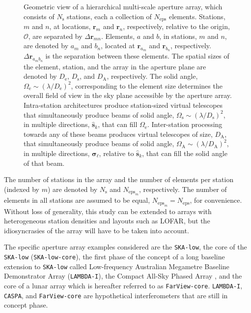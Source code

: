 \documentclass[
  journal=pasa,
  manuscript=article-type,
  year=2020,
  volume=37,
]{cup-journal}
\begin{document}
\begin{figure}
\caption{Geometric view of a hierarchical multi-scale aperture array, which consists of $N_\textrm{s}$ stations, each a collection of $N_\textrm{eps}$ elements. Stations, $m$ and $n$, at locations, $\boldsymbol{r}_m$ and $\boldsymbol{r}_n$, respectively, relative to the origin, $\mathcal{O}$, are separated by $\Delta\boldsymbol{r}_{mn}$. Elements, $a$ and $b$, in stations, $m$ and $n$, are denoted by $a_m$ and $b_n$, located at $\boldsymbol{r}_{a_m}$ and $\boldsymbol{r}_{b_n}$, respectively. $\Delta\boldsymbol{r}_{a_m b_n}$ is the separation between these elements. The spatial sizes of the element, station, and the array in the aperture plane are denoted by $D_\textrm{e}$, $D_\textrm{s}$, and $D_\textrm{A}$, respectively. The solid angle, $\Omega_\textrm{e}\sim (\lambda/D_\textrm{e})^2$, corresponding to the element size determines the overall field of view in the sky plane accessible by the aperture array. Intra-station architectures produce station-sized virtual telescopes that simultaneously produce beams of solid angle, $\Omega_\textrm{s}\sim (\lambda/D_\textrm{s})^2$, in multiple directions, $\hat{\boldsymbol{s}}_k$, that can fill $\Omega_\textrm{e}$. Inter-station processing towards any of these beams produces virtual telescopes of size, $D_\textrm{A}$, that simultaneously produce beams of solid angle, $\Omega_\textrm{A}\sim (\lambda/D_\textrm{A})^2$, in multiple directions, $\boldsymbol{\sigma}_\ell$, relative to $\hat{\boldsymbol{s}}_k$, that can fill the solid angle of that beam. 
\label{fig:geometry-notation}}
\end{figure}

The number of stations in the array and the number of elements per station (indexed by $m$) are denoted by $N_\textrm{s}$ and $N_{\textrm{eps}_m}$, respectively. The number of elements in all stations are assumed to be equal, $N_{\textrm{eps}_m} = N_\textrm{eps}$, for convenience. Without loss of generality, this study can be extended to arrays with heterogeneous station densities and layouts such as LOFAR, but the idiosyncrasies of the array will have to be taken into account.

The specific aperture array examples considered are the \texttt{SKA-low}, the core of the \texttt{SKA-low} (\texttt{SKA-low-core}), the first phase of the concept of a long baseline extension to \texttt{SKA-low} called Low-frequency Australian Megametre Baseline Demonstrator Array (\texttt{LAMBDA-I}), the Compact All-Sky Phased Array \citep[\texttt{CASPA}\footnote{Presently, CASPA's stations are intended for localisation and astrometry, rather than for aperture synthesis.};][]{Luo+2024}, and the core of a lunar array \citep[\texttt{FarView};][]{Polidan+2024} which is hereafter referred to as \texttt{FarView-core}. \texttt{LAMBDA-I}, \texttt{CASPA}, and \texttt{FarView-core} are hypothetical interferometers that are still in concept phase.
\end{document}
